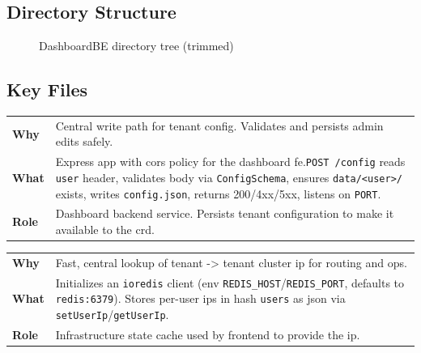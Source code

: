 \documentclass[11pt, a4paper, oneside, listof=totoc]{scrartcl}
\makeatletter
\newcommand{\codesummary}[3]{%
    \vspace{0.4\baselineskip}%
    \noindent\begin{tabularx}{\linewidth}{@{}>{\bfseries}l X@{}}
    Why  & #1\\
    What & #2\\
    Role & #3\\
    \end{tabularx}%
    \vspace{0.2\baselineskip}%
}
\makeatother
\begin{document}
            \subsection{Directory Structure}
            \begin{figure}[H]
                \centering
                \caption{DashboardBE directory tree (trimmed)}\label{fig:dashboardbe-tree}
            \end{figure}

        \clearpage

            \subsection{Key Files}
                \codesummary
                    {Central write path for tenant config. Validates and persists admin edits safely.}
                    {Express app with \gls{cors} policy for the dashboard \gls{fe}.\@\texttt{POST /config} reads \texttt{user} header, validates body via \texttt{ConfigSchema}, ensures \texttt{data/<user>/} exists, writes \texttt{config.json}, returns 200/4xx/5xx, listens on \texttt{PORT}.}
                    {Dashboard backend service. Persists tenant configuration to make it available to the \gls{crd}.}

                \codesummary
                    {Fast, central lookup of tenant -> tenant cluster \gls{ip} for routing and ops.}
                    {Initializes an \texttt{ioredis} client (env \texttt{REDIS\_HOST}/\texttt{REDIS\_PORT}, defaults to \texttt{redis:6379}). Stores per-user \glspl{ip} in hash \texttt{users} as \gls{json} via \texttt{setUserIp}/\texttt{getUserIp}.}
                    {Infrastructure state cache used by frontend to provide the \gls{ip}.}
\end{document}
